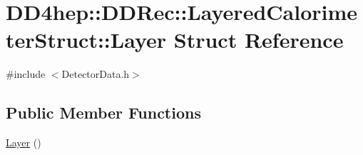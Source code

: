 \hypertarget{struct_d_d4hep_1_1_d_d_rec_1_1_layered_calorimeter_struct_1_1_layer}{}\section{D\+D4hep\+:\+:D\+D\+Rec\+:\+:Layered\+Calorimeter\+Struct\+:\+:Layer Struct Reference}
\label{struct_d_d4hep_1_1_d_d_rec_1_1_layered_calorimeter_struct_1_1_layer}


{\ttfamily \#include $<$Detector\+Data.\+h$>$}

\subsection*{Public Member Functions}
\begin{DoxyCompactItemize}
\item 
\hyperlink{struct_d_d4hep_1_1_d_d_rec_1_1_layered_calorimeter_struct_1_1_layer_ad13df3e5858587a746ce2d5029341010}{Layer} ()
\end{DoxyCompactItemize}
